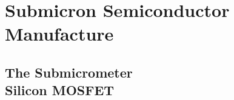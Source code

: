 \documentclass{WileySix}
\begin{document}








\part[Submicron Semiconductor Manufacture]
{Submicron Semiconductor\\ Manufacture}

\chapter[The Submicrometer Silicon MOSFET]
{The Submicrometer\\ Silicon MOSFET}



\end{document}
